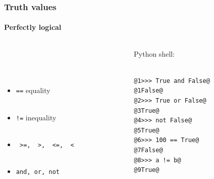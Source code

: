\documentclass[handout]{beamer}
\begin{document}
\begin{frame}[fragile]
\frametitle{Truth values}
\framesubtitle{Perfectly logical}
\large
  \begin{columns}[T]
    \begin{column}{.5\textwidth} 
\ \\ 

\ \\ 


\ \\ 


\begin{itemize}


\item \texttt{==}  equality \\ \
\item  \texttt{!=} inequality \\ \
 \item  \texttt{ >=,~ >,~ <=,~ <}\\ \
 \item  \texttt{and, or, not} \\ \



\end{itemize}
     \end{column}
     
         \begin{column}{.5\textwidth} 
         Python shell: \\ \
\begin{lstlisting}[style=base]
@1>>> True and False@
@1False@
@2>>> True or False@
@3True@
@4>>> not False@
@5True@
@6>>> 100 == True@
@7False@
@8>>> a != b@
@9True@
\end{lstlisting}

    \end{column}
    \end{columns}

\end{frame}
%
\end{document}
